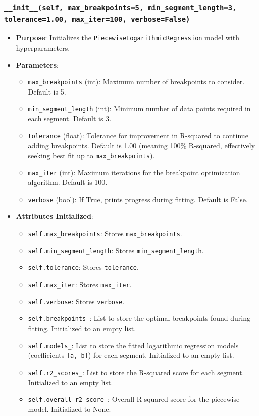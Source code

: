 \documentclass[12pt,a4paper]{report}
\begin{document}
{\subsubsection{\texttt{\_\_init\_\_(self, max\_breakpoints=5, min\_segment\_length=3, tolerance=1.00, max\_iter=100, verbose=False)}}
\begin{itemize}
    \item \textbf{Purpose}: Initializes the \texttt{PiecewiseLogarithmicRegression} model with hyperparameters.
    \item \textbf{Parameters}:
        \begin{itemize}
            \item \texttt{max\_breakpoints} (int): Maximum number of breakpoints to consider. Default is 5.
            \item \texttt{min\_segment\_length} (int): Minimum number of data points required in each segment. Default is 3.
            \item \texttt{tolerance} (float): Tolerance for improvement in R-squared to continue adding breakpoints. Default is 1.00 (meaning 100\% R-squared, effectively seeking best fit up to \texttt{max\_breakpoints}).
            \item \texttt{max\_iter} (int): Maximum iterations for the breakpoint optimization algorithm. Default is 100.
            \item \texttt{verbose} (bool): If True, prints progress during fitting. Default is False.
        \end{itemize}
    \item \textbf{Attributes Initialized}:
        \begin{itemize}
            \item \texttt{self.max\_breakpoints}: Stores \texttt{max\_breakpoints}.
            \item \texttt{self.min\_segment\_length}: Stores \texttt{min\_segment\_length}.
            \item \texttt{self.tolerance}: Stores \texttt{tolerance}.
            \item \texttt{self.max\_iter}: Stores \texttt{max\_iter}.
            \item \texttt{self.verbose}: Stores \texttt{verbose}.
            \item \texttt{self.breakpoints\_}: List to store the optimal breakpoints found during fitting. Initialized to an empty list.
            \item \texttt{self.models\_}: List to store the fitted logarithmic regression models (coefficients \texttt{[a, b]}) for each segment. Initialized to an empty list.
            \item \texttt{self.r2\_scores\_}: List to store the R-squared score for each segment. Initialized to an empty list.
            \item \texttt{self.overall\_r2\_score\_}: Overall R-squared score for the piecewise model. Initialized to None.
        \end{itemize}
\end{itemize}

}
\end{document}
